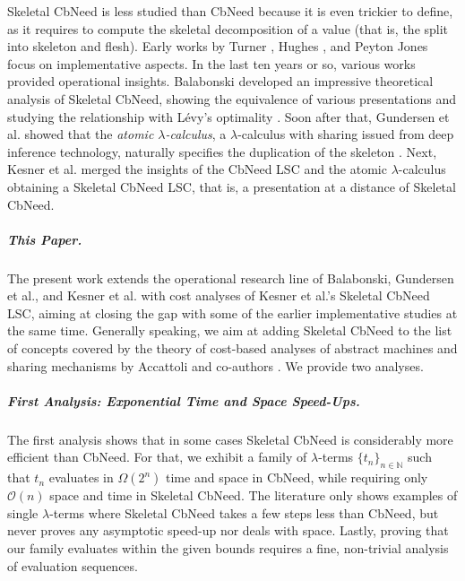 \documentclass[10pt,a4paper]{article}
\theoremstyle{remark}
\newcommand{\tm}{t}
\renewcommand{\l}{\lambda}
\newcommand{\levy}{{L{\'e}vy}\xspace}
\newcommand{\nat}{\mathbb{N}}
\newcommand{\cbneed}{CbNeed\xspace}
\newcommand{\bigo}{{\mathcal{O}}}
\begin{document}
Skeletal \cbneed is less studied than \cbneed because it is even trickier to define, as it requires to compute the skeletal decomposition of a value (that is, the split into skeleton and flesh). Early works by Turner \cite{DBLP:journals/spe/Turner79}, Hughes \cite{hughes:thesis}, and Peyton Jones \cite{DBLP:books/ph/Jones87} focus on implementative aspects. In the last ten years or so, various works provided operational insights. Balabonski developed an impressive theoretical analysis of Skeletal \cbneed, showing the equivalence of various presentations \cite{DBLP:conf/popl/Balabonski12} and studying the relationship with \levy's optimality \cite{DBLP:conf/icfp/Balabonski13}. Soon after that, Gundersen et al. showed that the \emph{atomic $\l$-calculus}, a $\l$-calculus with sharing issued from deep inference technology, naturally specifies the duplication of the skeleton \cite{DBLP:conf/lics/GundersenHP13}. Next, Kesner et al. \cite{DBLP:journals/lmcs/KesnerPV24} merged the insights of the \cbneed LSC and the atomic $\l$-calculus obtaining a Skeletal \cbneed LSC, that is, a presentation at a distance of Skeletal \cbneed.

\subparagraph{This Paper.} The present work extends the operational research line of Balabonski, Gundersen et al., and Kesner et al. with cost analyses of Kesner et al.'s Skeletal \cbneed LSC, aiming at closing the gap with some of the earlier implementative studies at the same time. Generally speaking, we aim at adding Skeletal \cbneed to the list of concepts covered by the theory of cost-based analyses of abstract machines and sharing mechanisms by Accattoli and co-authors \cite{DBLP:conf/icfp/AccattoliBM14,DBLP:journals/corr/AccattoliL16,DBLP:journals/iandc/AccattoliC17,DBLP:conf/ppdp/AccattoliB17,DBLP:conf/ppdp/AccattoliCGC19,DBLP:conf/ppdp/CondoluciAC19,DBLP:journals/scp/AccattoliG19,DBLP:journals/pacmpl/AccattoliLV21,DBLP:conf/lics/AccattoliCC21,DBLP:journals/lmcs/AccattoliLV24}. We provide two analyses.

\subparagraph{First Analysis: Exponential Time and Space Speed-Ups.} The first analysis shows that in some cases Skeletal \cbneed is considerably more efficient than \cbneed. For that, we exhibit a family of $\l$-terms $\{\tm_n\}_{n\in\nat}$ such that $\tm_n$ evaluates in $\Omega(2^n)$ time and space in \cbneed, while requiring only $\bigo(n)$ space and time in Skeletal \cbneed. 
The literature only shows examples of single $\l$-terms where Skeletal \cbneed takes a few steps less than \cbneed, but never proves any asymptotic speed-up nor deals with space. Lastly, proving that our family evaluates within the given bounds requires a fine, non-trivial analysis of evaluation sequences.
\end{document}
